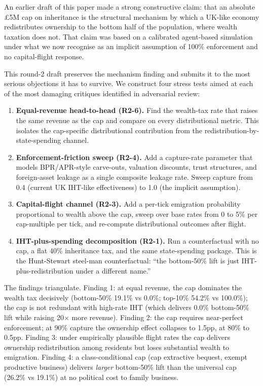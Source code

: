 \documentclass[11pt]{article}
\begin{document}
An earlier draft of this paper made a strong constructive claim:
that an absolute \pounds 5M cap on inheritance is the structural
mechanism by which a UK-like economy redistributes ownership to the
bottom half of the population, where wealth taxation does not.  That
claim was based on a calibrated agent-based simulation under what
we now recognise as an implicit assumption of 100\% enforcement and
no capital-flight response.

This round-2 draft preserves the mechanism finding and submits it
to the most serious objections it has to survive.  We construct
four stress tests aimed at each of the most damaging critiques
identified in adversarial review:

\begin{enumerate}
\item \textbf{Equal-revenue head-to-head (R2-6).}  Find the wealth-tax
rate that raises the same revenue as the cap and compare on every
distributional metric.  This isolates the cap-specific distributional
contribution from the redistribution-by-state-spending channel.

\item \textbf{Enforcement-friction sweep (R2-4).}  Add a capture-rate
parameter that models BPR/APR-style carve-outs, valuation discounts,
trust structures, and foreign-asset leakage as a single composite
leakage rate.  Sweep capture from 0.4 (current UK IHT-like
effectiveness) to 1.0 (the implicit assumption).

\item \textbf{Capital-flight channel (R2-3).}  Add a per-tick
emigration probability proportional to wealth above the cap, sweep
over base rates from 0 to 5\% per cap-multiple per tick, and
re-compute distributional outcomes after flight.

\item \textbf{IHT-plus-spending decomposition (R2-1).}  Run a
counterfactual with no cap, a flat 40\% inheritance tax, and the same
state-spending package.  This is the Hunt-Stewart steel-man
counterfactual: ``the bottom-50\% lift is just IHT-plus-redistribution
under a different name.''
\end{enumerate}

The findings triangulate.  Finding 1: at equal revenue, the cap
dominates the wealth tax decisively (bottom-50\% 19.1\% vs 0.0\%;
top-10\% 54.2\% vs 100.0\%); the cap is not redundant with
high-rate IHT (which delivers 0.0\% bottom-50\% lift while raising
20$\times$ more revenue).  Finding 2: the cap requires near-perfect
enforcement; at 90\% capture the ownership effect collapses to
1.5pp, at 80\% to 0.5pp.  Finding 3: under empirically plausible
flight rates the cap delivers ownership redistribution among
residents but loses substantial wealth to emigration.  Finding 4:
a class-conditional cap (cap extractive bequest, exempt productive
business) delivers \emph{larger} bottom-50\% lift than the
universal cap (26.2\% vs 19.1\%) at no political cost to family
business.
\end{document}
